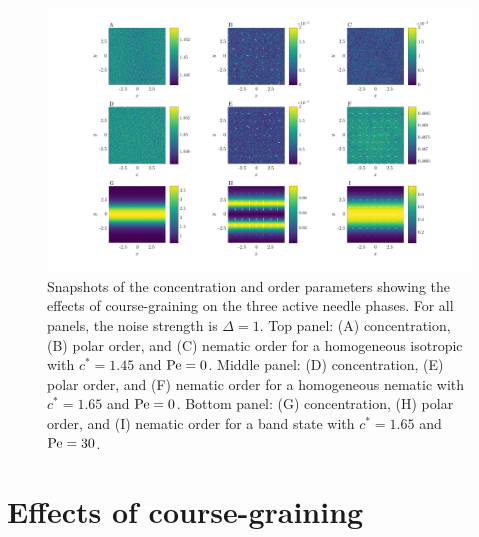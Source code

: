 \begin{figure}[!b]
	\centering
  \includegraphics[width=1.00\textwidth]{figs/ch05_valid/noise_compare.png}
  \caption[Course-graining]
  {Snapshots of the concentration and order parameters showing the effects of
    course-graining on the three active needle phases. For all panels, the noise
    strength is $\Delta = 1$. Top
    panel: (A) concentration, (B) polar order, and (C) nematic order for a
    homogeneous isotropic with $c^* = 1.45$ and $\text{Pe} = 0$. Middle panel:
    (D) concentration, (E) polar order, and (F) nematic  order for a
    homogeneous nematic with $c^* = 1.65$ and $\text{Pe} = 0$. Bottom panel:
    (G) concentration, (H) polar order, and (I) nematic order for a
    band state with $c^* = 1.65$ and $\text{Pe} = 30$.}\label{fig:noise_compare}
\end{figure}

\section{Effects of course-graining}

